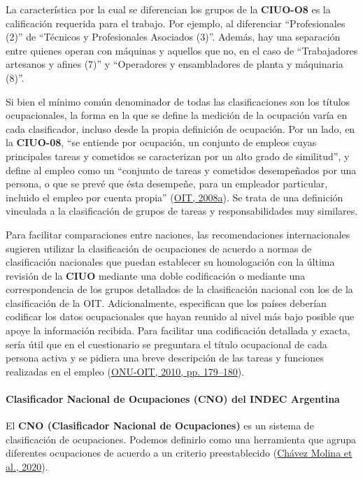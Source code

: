 \documentclass[
]{article}
\begin{document}
La característica por la cual se diferencian los grupos de la \textbf{CIUO-O8} es la calificación requerida para el trabajo. Por ejemplo, al diferenciar ``Profesionales (2)'' de ``Técnicos y Profesionales Asociados (3)''. Además, hay una separación entre quienes operan con máquinas y aquellos que no, en el caso de ``Trabajadores artesanos y afines (7)'' y ``Operadores y ensambladores de planta y máquinaria (8)''.

Si bien el mínimo común denominador de todas las clasificaciones son los títulos ocupacionales, la forma en la que se define la medición de la ocupación varía en cada clasificador, incluso desde la propia definición de ocupación. Por un lado, en la \textbf{CIUO-08}, ``se entiende por ocupación, un conjunto de empleos cuyas principales tareas y cometidos se caracterizan por un alto grado de similitud'', y define al empleo como un ``conjunto de tareas y cometidos desempeñados por una persona, o que se prevé que ésta desempeñe, para un empleador particular, incluido el empleo por cuenta propia'' (\protect\hyperlink{ref-OIT2008}{OIT, 2008a}). Se trata de una definición vinculada a la clasificación de grupos de tareas y responsabilidades muy similares.

Para facilitar comparaciones entre naciones, las recomendaciones internacionales sugieren utilizar la clasificación de ocupaciones de acuerdo a normas de clasificación nacionales que puedan establecer su homologación con la última revisión de la \textbf{CIUO} mediante una doble codificación o mediante una correspondencia de los grupos detallados de la clasificación nacional con los de la clasificación de la OIT. Adicionalmente, especifican que los países deberían codificar los datos ocupacionales que hayan reunido al nivel más bajo posible que apoye la información recibida. Para facilitar una codificación detallada y exacta, sería útil que en el cuestionario se preguntara el título ocupacional de cada persona activa y se pidiera una breve descripción de las tareas y funciones realizadas en el empleo (\protect\hyperlink{ref-ONUOIT2010}{ONU-OIT, 2010, pp. 179--180}).

\hypertarget{clasificador-nacional-de-ocupaciones-cno-del-indec-argentina}{%
\paragraph{Clasificador Nacional de Ocupaciones (CNO) del INDEC Argentina}\label{clasificador-nacional-de-ocupaciones-cno-del-indec-argentina}}

El \textbf{CNO (Clasificador Nacional de Ocupaciones)} es un sistema de clasificación de ocupaciones. Podemos definirlo como una herramienta que agrupa diferentes ocupaciones de acuerdo a un criterio preestablecido (\protect\hyperlink{ref-ChavezMolina.etal2020}{Chávez Molina et al., 2020}).
\end{document}
